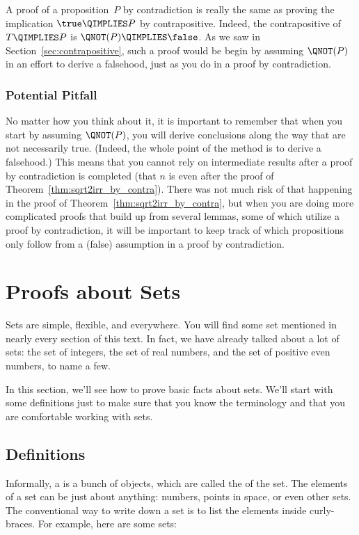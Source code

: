 A proof of a proposition~$P$ by contradiction is really the same as
proving the implication $\true \QIMPLIES P$ by contrapositive.
Indeed, the contrapositive of $T \QIMPLIES P$ is $\QNOT(P) \QIMPLIES
\false$.  As we saw in Section~\ref{sec:contrapositive},
such a proof would be begin by assuming $\QNOT(P)$ in an effort to
derive a falsehood, just as you do in a proof by contradiction.

\subsubsection{Potential Pitfall}

No matter how you think about it, it is important to remember that
when you start by assuming $\QNOT(P)$, you will derive conclusions
along the way that are not necessarily true.  (Indeed, the whole point
of the method is to derive a falsehood.)  This means that you cannot
rely on intermediate results after a proof by contradiction is
completed (\eg that $n$ is even after the proof of
Theorem~\ref{thm:sqrt2irr_by_contra}).  There was not much risk of
that happening in the proof of Theorem~\ref{thm:sqrt2irr_by_contra},
but when you are doing more complicated proofs that build up from
several lemmas, some of which utilize a proof by contradiction, it
will be important to keep track of which propositions only follow from
a (false) assumption in a proof by contradiction.

\section{Proofs about Sets}

Sets are simple, flexible, and everywhere.  You will find some set
mentioned in nearly every section of this text.  In fact, we have
already talked about a lot of sets: the set of integers, the set of
real numbers, and the set of positive even numbers, to name a few.

In this section, we'll see how to prove basic facts about sets.  We'll
start with some definitions just to make sure that you know the
terminology and that you are comfortable working with sets.

\subsection{Definitions}

Informally, a  is a bunch of objects, which are called the
 of the set.  The elements of a set can be just about
anything: numbers, points in space, or even other sets.  The conventional
way to write down a set is to list the elements inside curly-braces.  For
example, here are some sets:

